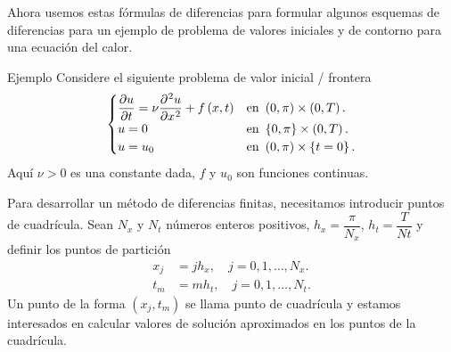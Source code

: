 \begin{frame}
	\frametitle{\insertsection}

	Ahora usemos estas fórmulas de diferencias para formular algunos
	esquemas de diferencias para un ejemplo de problema de valores
	iniciales y de contorno para una ecuación del calor.
	\begin{exampleblock}{Ejemplo}
		Considere el siguiente problema de valor inicial / frontera
		\begin{equation}\label{eq:heatPDE}
			\begin{cases}\displaystyle
				\diffp{u}{t}=
				\nu\diffp[2]{u}{x}+
				f\left(x,t\right) &
				\text{en }\left(0,\pi\right)\times\left(0,T\right).   \\
				u=0               &
				\text{en }\left\{0,\pi\right\}\times\left(0,T\right). \\
				u=u_{0}           &
				\text{en }\left(0,\pi\right)\times\left\{t=0\right\}.
			\end{cases}
		\end{equation}
		Aquí $\nu>0$ es una constante dada, $f$ y $u_{0}$ son funciones
		continuas.
	\end{exampleblock}
	Para desarrollar un método de diferencias finitas, necesitamos
	introducir puntos de cuadrícula.
	Sean $N_{x}$ y $N_{t}$ números enteros positivos,
	$h_{x}=\dfrac{\pi}{N_{x}}$, $h_{t}=\dfrac{T}{Nt}$ y definir los
	puntos de partición
	\begin{align*}
		x_{j} & =
		jh_{x},\quad j=0,1,\dotsc,N_{x}. \\
		t_{m} & =
		mh_{t},\quad j=0,1,\dotsc,N_{t}.
	\end{align*}
	Un punto de la forma $\left(x_{j},t_{m}\right)$ se llama punto de
	cuadrícula y estamos interesados en calcular valores de solución
	aproximados en los puntos de la cuadrícula.
\end{frame}


